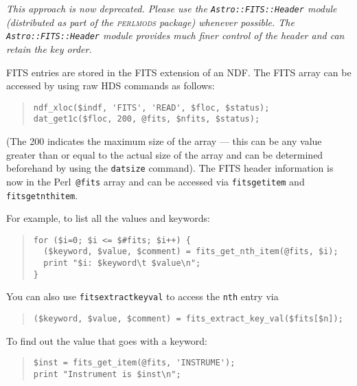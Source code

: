 \documentclass[twoside,11pt]{article}
\newenvironment{myquote}{\begin{quote}\begin{small}}{\end{small}\end{quote}}
\newcommand{\perl}{\xref{\textsf{Perl}}{sun193}{}}
\newcommand{\xref}[3]{#1}
\renewcommand{\_}{\texttt{\symbol{95}}}
\begin{document}
\textit{This approach is now deprecated. Please use the
  \texttt{Astro::FITS::Header} module (distributed as part of the
  \textsc{perlmods} package) whenever possible. The
  \texttt{Astro::FITS::Header} module provides much finer control of the
  header and can retain the key order.}

FITS entries are stored in the FITS extension of an NDF. The FITS array
can be accessed by using raw HDS commands as follows:

\begin{myquote}
\begin{verbatim}
ndf_xloc($indf, 'FITS', 'READ', $floc, $status);
dat_get1c($floc, 200, @fits, $nfits, $status);
\end{verbatim}
\end{myquote}

(The 200 indicates the maximum size of the array --- this can be any
value greater than or equal to the actual size of the array and can be
determined beforehand by using the \texttt{dat\_size} command).  The FITS
header information is now in the \perl\ \texttt{@fits} array and can be accessed
via \texttt{fits\_get\_item} and \texttt{fits\_get\_nth\_item}.

For example, to list all the values and keywords:

\begin{myquote}
\begin{verbatim}
for ($i=0; $i <= $#fits; $i++) {
  ($keyword, $value, $comment) = fits_get_nth_item(@fits, $i);
  print "$i: $keyword\t $value\n";
}
\end{verbatim}
\end{myquote}

You can also use \texttt{fits\_extract\_key\_val} to
access the \texttt{nth} entry via

\begin{myquote}
\begin{verbatim}
($keyword, $value, $comment) = fits_extract_key_val($fits[$n]);
\end{verbatim}
\end{myquote}

To find out the value that goes with a keyword:

\begin{myquote}
\begin{verbatim}
$inst = fits_get_item(@fits, 'INSTRUME');
print "Instrument is $inst\n";
\end{verbatim}
\end{myquote}
\end{document}
